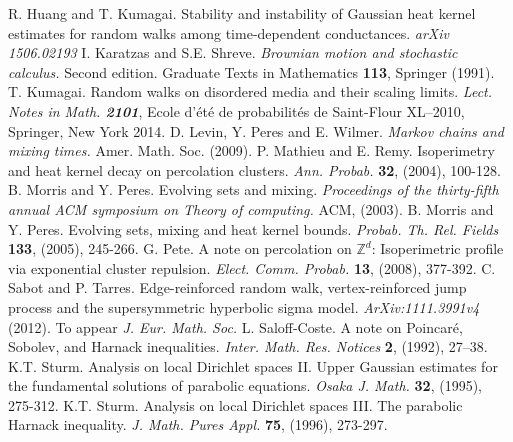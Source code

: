 \documentclass[12pt,reqno]{amsart}
\numberwithin{equation}{section}
\theoremstyle{definition}
\begin{document}
\begin{thebibliography}{99}
R. Huang and T. Kumagai. Stability and instability of Gaussian heat kernel estimates for random walks among time-dependent conductances. {\emph{arXiv 1506.02193}}
I. Karatzas and S.E. Shreve. {\emph{Brownian motion and stochastic calculus.}} Second edition. Graduate Texts in Mathematics {\bf{113}}, Springer (1991).
T. Kumagai. Random walks on disordered media and their scaling limits. \emph{Lect. Notes in Math. {\bf 2101}},
Ecole d'\'{e}t\'{e} de probabilit\'{e}s de Saint-Flour XL--2010, Springer, New York 2014. 
D. Levin, Y. Peres and E. Wilmer. {\emph{Markov chains and mixing times.}} Amer. Math. Soc. (2009).
P. Mathieu and E. Remy. Isoperimetry and heat kernel decay on percolation clusters. {\emph{Ann. Probab.}} {\bf 32}, (2004),  
100-128.
B. Morris and Y. Peres. Evolving sets and mixing. {\emph{Proceedings of the thirty-fifth annual ACM symposium on Theory of computing.}} ACM, (2003).
B. Morris and Y. Peres. Evolving sets, mixing and heat kernel bounds. {\emph{Probab. Th. Rel. Fields}} {\bf{133}}, (2005), 245-266.
G. Pete. A note on percolation on ${\mathbb{Z}}^d$: Isoperimetric profile via exponential cluster repulsion. {\emph{Elect. Comm. Probab.}} {\bf 13}, (2008), 377-392.
C. Sabot and P. Tarres. 
Edge-reinforced random walk, vertex-reinforced jump process and the supersymmetric hyperbolic sigma model.
{\emph{ArXiv:1111.3991v4}} (2012). To appear \emph{J. Eur. Math. Soc.}
 L. Saloff-Coste. A note on Poincar\'e, Sobolev, and Harnack
inequalities. {\it Inter. Math. Res. Notices} {\bf 2}, (1992), 27--38.
K.T. Sturm. Analysis on local Dirichlet spaces II. Upper Gaussian estimates for the fundamental solutions of parabolic equations. {\emph{Osaka J. Math.}} {\bf{32}}, (1995), 275-312.
K.T. Sturm.  Analysis on local Dirichlet spaces III. The parabolic Harnack inequality. {\emph{J. Math. Pures Appl.}} {\bf{75}}, (1996), 273-297.
\end{thebibliography}
\end{document}
